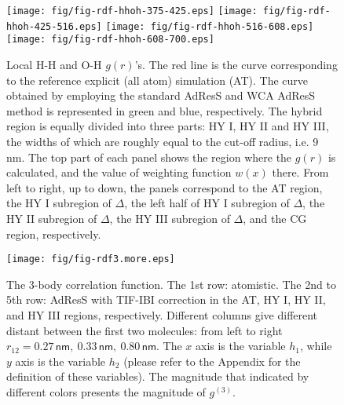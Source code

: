 \documentclass[aip,jcp,a4paper,reprint,onecolumn]{revtex4-1}
\begin{document}
\begin{figure}
  \centering
  \texttt{[image: fig/fig-rdf-hhoh-375-425.eps]}
  \texttt{[image: fig/fig-rdf-hhoh-425-516.eps]}
  \texttt{[image: fig/fig-rdf-hhoh-516-608.eps]}
  \texttt{[image: fig/fig-rdf-hhoh-608-700.eps]}
  \caption{Local H-H and O-H $g(r)$'s.
    The red line is the curve corresponding to the reference explicit (all atom)
    simulation (AT).
    The curve obtained by employing the standard AdResS and WCA AdResS
    method is represented in green and blue, respectively.
    The hybrid region is equally
    divided into three parts: HY I, HY II and HY III, the widths of
    which are roughly equal to the cut-off radius, i.e. 9 \textsf{nm}.    
    The top part of each panel shows the region where the $g(r)$ is calculated,
    and the value of weighting function $w(x)$ there.
    From left to right, up to down, the panels correspond to the AT region, 
    the HY I subregion of $\Delta$,
    the left half of HY I subregion of $\Delta$,
    the HY II subregion of $\Delta$,
    the HY III subregion of $\Delta$,
    and the CG region, respectively.
  }
  \label{fig:tmp2a}
\end{figure}


\begin{figure}
  \centering
  \texttt{[image: fig/fig-rdf3.more.eps]}
  \caption{The 3-body correlation function.  The 1st row:
    atomistic.
    The 2nd to 5th row:
    AdResS with TIF-IBI correction in the AT, HY I, HY II, and HY III
    regions, respectively.
    Different columns give different distant between
    the first two molecules: from left to right $r_{12} =
    0.27\,\textsf{nm},\ 0.33\,\textsf{nm},\  
    0.80\,\textsf{nm}$.  The $x$ axis is the variable $h_1$, while $y$
    axis is the variable $h_2$ (please refer to the Appendix for the
    definition of these variables).  The magnitude that indicated by
    different colors presents the magnitude of $g^{(3)}$.
  }
  \label{fig:tmp2b}
\end{figure}




% 
\end{document}
